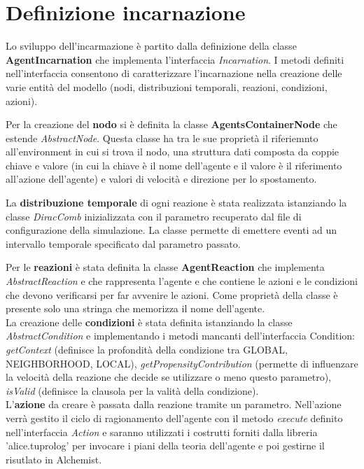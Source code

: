 \documentclass[12pt,a4paper,openright,twoside]{report}
\begin{document}
\section{Definizione incarnazione}
Lo sviluppo dell'incarmazione \`e partito dalla definizione della classe \textbf{AgentIncarnation} che implementa l'interfaccia \textit{Incarnation}. I metodi definiti nell'interfaccia consentono di caratterizzare l'incarnazione nella creazione delle varie entit\`a del modello (nodi, distribuzioni temporali, reazioni, condizioni, azioni).

Per la creazione del \textbf{nodo} si \`e definita la classe \textbf{AgentsContainerNode} che estende \textit{AbstractNode}. Questa classe ha tra le sue propriet\`a il riferiemnto all'environment in cui si trova il nodo, una struttura dati composta da coppie chiave e valore (in cui la chiave \`e il nome dell'agente e il valore \`e il riferimento all'azione dell'agente) e valori di velocit\`a e direzione per lo spostamento.

La \textbf{distribuzione temporale} di ogni reazione \`e stata realizzata istanziando la classe \textit{DiracComb} inizializzata con il parametro recuperato dal file di configurazione della simulazione. La classe permette di emettere eventi ad un intervallo temporale specificato dal parametro passato.

Per le \textbf{reazioni} \`e stata definita la classe \textbf{AgentReaction} che implementa \textit{AbstractReaction} e che rappresenta l'agente e che contiene le azioni e le condizioni che devono verificarsi per far avvenire le azioni. Come propriet\`a della classe \`e presente solo una stringa che memorizza il nome dell'agente.
\\
La creazione delle \textbf{condizioni} \`e stata definita istanziando la classe \textit{AbstractCondition} e implementando i metodi mancanti dell'interfaccia Condition: \textit{getContext} (definisce la profondit\`a della condizione tra GLOBAL, NEIGHBORHOOD, LOCAL), \textit{getPropensityContribution} (permette di influenzare la velocit\`a della reazione che decide se utilizzare o meno questo parametro), \textit{isValid} (definisce la clausola per la valit\`a della condizione).
\\
L'\textbf{azione} da creare \`e passata dalla reazione tramite un parametro. Nell'azione verr\`a gestito il ciclo di ragionamento dell'agente con il metodo \textit{execute} definito nell'interfaccia \textit{Action} e saranno utilizzati i costrutti forniti dalla libreria 'alice.tuprolog' per invocare i piani della teoria dell'agente e poi gestirne il risutlato in Alchemist.
\end{document}
